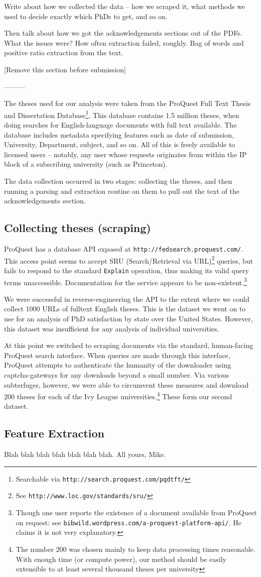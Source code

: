 Write about how we collected the data -- how we scraped it, what methods we used to decide exactly which PhDs to get, and so on.

Then talk about how we got the acknowledgements sections out of the PDFs. What the issues were? How often extraction failed, roughly. Bag of words and positive ratio extraction from the text.

[Remove this section before submission]

---------

The theses used for our analysis were taken from the ProQuest Full Text Thesis and Dissertation Database\footnote{Searchable via \texttt{http://search.proquest.com/pqdtft/}}. This database contains 1.5 million theses, when doing searches for English-language documents with full text available. The database includes metadata specifying features such as date of submission, University, Department, subject, and so on. All of this is freely available to licensed users -- notably, any user whose requests originates from within the IP block of a subscribing university (such as Princeton).

The data collection occurred in two stages: collecting the theses, and then running a parsing and extraction routine on them to pull out the text of the acknowledgements section.

\subsection*{Collecting theses (scraping)}
ProQuest has a database API exposed at \texttt{http://fedsearch.proquest.com/}. This access point seems to accept SRU (Search/Retrieval via URL)\footnote{See \texttt{http://www.loc.gov/standards/sru/}} queries, but fails to respond to the standard \texttt{Explain} operation, thus making its valid query terms unaccessible. Documentation for the service appears to be non-existent.\footnote{Though one user reports the existence of a document available from ProQuest on request: see \texttt{bibwild.wordpress.com/a-proquest-platform-api/}. He claims it is not very explanatory.}

We were successful in reverse-engineering the API to the extent where we could collect 1000 URLs of fulltext English theses. This is the dataset we went on to use for an analysis of PhD satisfaction by state over the United States. However, this dataset was insufficient for any analysis of individual universities.

At this point we switched to scraping documents via the standard, human-facing ProQuest search interface. When queries are made through this interface, ProQuest attempts to authenticate the humanity of the downloader using captcha-gateways for any downloads beyond a small number. Via various subterfuges, however, we were able to circumvent these measures and download 200 theses for each of the Ivy League universities.\footnote{The number 200 was chosen mainly to keep data processing times reasonable. With enough time (or compute power), our method should be easily extensible to at least several thousand theses per university} These form our second dataset.

\subsection*{Feature Extraction}

Blah blah blah blah blah blah blah. All yours, Mike.